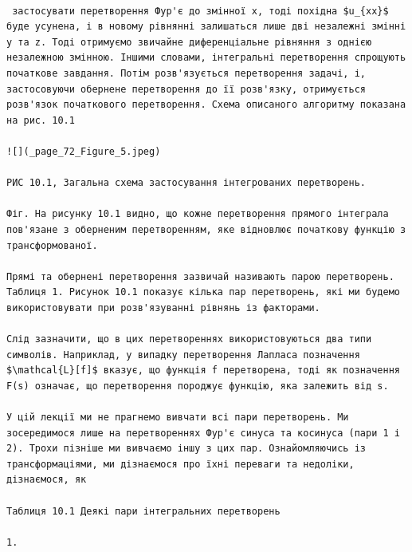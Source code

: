 \documentclass[
  ukrainian,
]{article}
\begin{document}
\begin{verbatim}

 застосувати перетворення Фур'є до змінної x, тоді похідна $u_{xx}$ буде усунена, і в новому рівнянні залишаться лише дві незалежні змінні y та z. Тоді отримуємо звичайне диференціальне рівняння з однією незалежною змінною. Іншими словами, інтегральні перетворення спрощують початкове завдання. Потім розв'язується перетворення задачі, і, застосовуючи обернене перетворення до її розв'язку, отримується розв'язок початкового перетворення. Схема описаного алгоритму показана на рис. 10.1

![](_page_72_Figure_5.jpeg)

РИС 10.1, Загальна схема застосування інтегрованих перетворень.

Фіг. На рисунку 10.1 видно, що кожне перетворення прямого інтеграла пов'язане з оберненим перетворенням, яке відновлює початкову функцію з трансформованої.

Прямі та обернені перетворення зазвичай називають парою перетворень. Таблиця 1. Рисунок 10.1 показує кілька пар перетворень, які ми будемо використовувати при розв'язуванні рівнянь із факторами.

Слід зазначити, що в цих перетвореннях використовуються два типи символів. Наприклад, у випадку перетворення Лапласа позначення $\mathcal{L}[f]$ вказує, що функція f перетворена, тоді як позначення F(s) означає, що перетворення породжує функцію, яка залежить від s.

У цій лекції ми не прагнемо вивчати всі пари перетворень. Ми зосередимося лише на перетвореннях Фур'є синуса та косинуса (пари 1 і 2). Трохи пізніше ми вивчаємо іншу з цих пар. Ознайомляючись із трансформаціями, ми дізнаємося про їхні переваги та недоліки, дізнаємося, як

Таблиця 10.1 Деякі пари інтегральних перетворень

1.


\end{verbatim}
\end{document}
